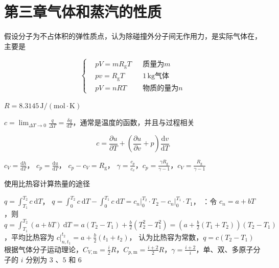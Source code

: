 \section{第三章\quad 气体和蒸汽的性质}
假设分子为不占体积的弹性质点，认为除碰撞外分子间无作用力，是实际气体在，主要是


$$
    \left\{
    \begin{aligned}
         & pV=mR_{\mathrm{g}}T &  & \text{质量为} m      \\
         & pv=R_{\mathrm{g}}T  &  & 1\,\mathrm{kg} 气体 \\
         & pV=nRT              &  & \text{物质的量为} n
    \end{aligned}
    \right.
$$

$R=8.3145\,\mathrm{J/(mol\cdot K)}$

\divider

 $\displaystyle c=\lim_{\Delta T\to 0}\frac{q}{\Delta T}=\frac{\delta q}{\mathrm{d}T}$，通常是温度的函数，并且与过程相关

$$
    c=\frac{\partial u}{\partial T}+\left(\frac{\partial u}{\partial v}+p\right)\frac{\mathrm{d}v}{\mathrm{d}T}
$$

 $\displaystyle c_V=\frac{\mathrm{d}h}{\mathrm{d}T}$，
 $\displaystyle c_p=\frac{\mathrm{d}u}{\mathrm{d}T}$，
 $c_p-c_V=R_\mathrm{g}$，
 $\displaystyle \gamma = \frac{c_p}{c_v}$，$\displaystyle c_p=\frac{\gamma R_\mathrm{g}}{\gamma -1}$，$\displaystyle c_V=\frac{R_\mathrm{g}}{\gamma -1}$

\divider


\divider

使用比热容计算热量的途径

 $q = \int_{T_1}^{T_2} c\ \mathrm{d}T$，
 $q=\int_0^{T_2} c\ \mathrm{d}T - \int_0^{T_1} c\ \mathrm{d}T = c_n\vert_0^{T_2}\cdot T_2-c_n\vert_0^{T_1}\cdot T_1$，
：令 $c_n= a + bT$，则 $q = \int_{T_1}^{T_2} (a + bT)\ \mathrm{d}T = a(T_2-T_1)+\frac{b}{2}(T_2^2-T_1^2) = \left(a + \frac{b}{2}(T_1+T_2)\right)(T_2-T_1)$，平均比热容为 $c\vert_{n,t_1}^{t_2}=a+\frac{b}{2}(t_1+t_2)$，
认为比热容为常数，$q = c(T_2-T_1)$ 根据气体分子运动理论，$C_{V,\mathrm{m}}=\frac{i}{2}R$，$C_{p,\mathrm{m}}=\frac{i+2}{2}R$，$\gamma=\frac{i+2}{i}$，单、双、多原子分子的 $i$ 分别为 $3$ 、$5$ 和 $6$

